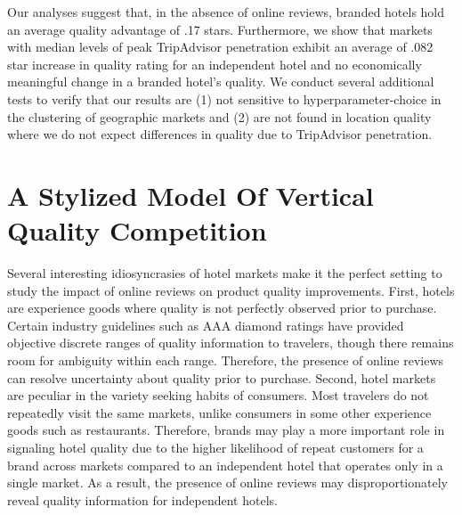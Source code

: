 \documentclass[mksc,blindrev]{informs3} %
\begin{document}
Our analyses suggest that, in the absence of online reviews, branded hotels hold an average quality advantage of .17 stars. Furthermore, we show that markets with median levels of peak TripAdvisor penetration exhibit an average of .082 star increase in quality rating for an independent hotel and no economically meaningful change in a branded hotel's quality. We conduct several additional tests to verify that our results are (1) not sensitive to hyperparameter-choice in the clustering of geographic markets and (2) are not found in location quality where we do not expect differences in quality due to TripAdvisor penetration.


\section{A Stylized Model Of Vertical Quality Competition} \label{sec:theory}

Several interesting idiosyncrasies of hotel markets make it the perfect setting to study the impact of online reviews on product quality improvements. First, hotels are experience goods where quality is not perfectly observed prior to purchase. Certain industry guidelines such as AAA diamond ratings have provided objective discrete ranges of quality information to travelers, though there remains room for ambiguity within each range. Therefore, the presence of online reviews can resolve uncertainty about quality prior to purchase. Second, hotel markets are peculiar in the variety seeking habits of consumers. Most travelers do not repeatedly visit the same markets, unlike consumers in some other experience goods such as restaurants. Therefore, brands may play a more important role in signaling hotel quality due to the higher likelihood of repeat customers for a brand across markets compared to an independent hotel that operates only in a single market. As a result, the presence of online reviews may disproportionately reveal quality information for independent hotels.
\end{document}
